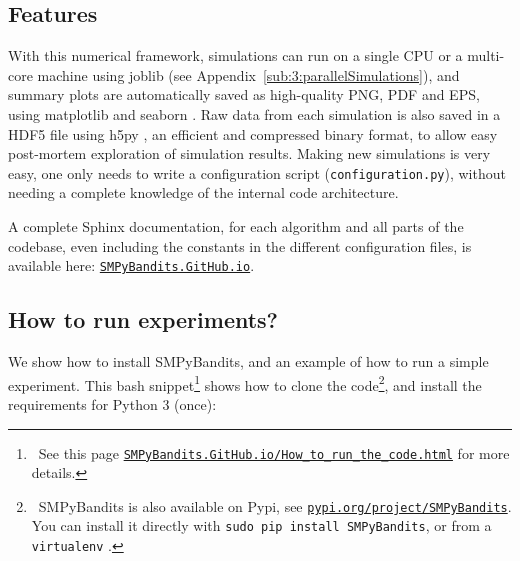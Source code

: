 \begin{small}
    \inputminted[linenos=true,numbersep=5pt,frame=lines,framesep=2mm]{python3}{2-Chapters/3-Chapter/src/example_of_a_IndexPolicy_UCB.py}
\end{small}


\subsection{Features}

With this numerical framework, simulations can run on a single CPU or a multi-core machine using joblib \cite{joblib} (see Appendix~\ref{sub:3:parallelSimulations}),
and summary plots are automatically saved as high-quality PNG, PDF and EPS, using matplotlib \cite{matplotlib} and seaborn \cite{seaborn}.
Raw data from each simulation is also saved in a HDF5 file using h5py \cite{h5py}, an efficient and compressed binary format, to allow easy post-mortem exploration of simulation results.
Making new simulations is very easy, one only needs to write a configuration script (\texttt{configuration.py}), without needing a complete knowledge of the internal code architecture.

A complete Sphinx documentation, for each algorithm and all parts of the codebase, even including the constants in the different configuration files, is available here: \texttt{\href{https://SMPyBandits.GitHub.io}{SMPyBandits.GitHub.io}}.


\subsection{How to run experiments?}

We show how to install SMPyBandits, and an example of how to run a simple experiment.
This bash snippet\footnote{~See this page \texttt{\href{https://SMPyBandits.GitHub.io/How_to_run_the_code.html}{SMPyBandits.GitHub.io/How\_to\_run\_the\_code.html}} for more details.} shows how to clone the code\footnote{~SMPyBandits is also available on Pypi, see \texttt{\href{https://pypi.org/project/SMPyBandits/}{pypi.org/project/SMPyBandits}}. You can install it directly with \texttt{sudo pip install SMPyBandits}, or from a \texttt{virtualenv} \cite{virtualenv}.},
and install the requirements for Python 3 (once):

